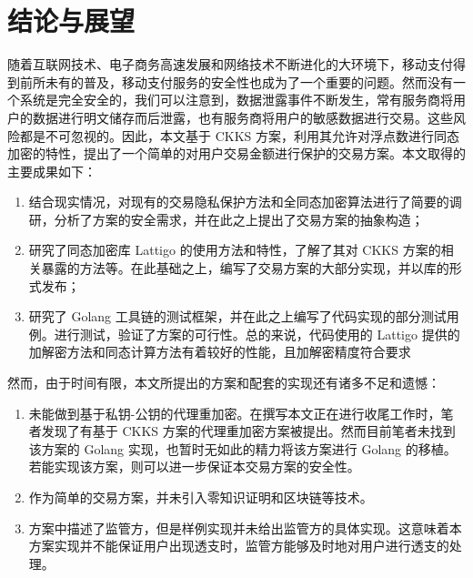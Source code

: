 \chapter{结论与展望}

随着互联网技术、电子商务高速发展和网络技术不断进化的大环境下，移动支付得到前所未有的普及，移动支付服务的安全性也成为了一个重要的问题。然而没有一个系统是完全安全的，我们可以注意到，数据泄露事件不断发生，常有服务商将用户的数据进行明文储存而后泄露，也有服务商将用户的敏感数据进行交易。这些风险都是不可忽视的。因此，本文基于 CKKS 方案，利用其允许对浮点数进行同态加密的特性，提出了一个简单的对用户交易金额进行保护的交易方案。本文取得的主要成果如下：

\begin{enumerate}
    \item 结合现实情况，对现有的交易隐私保护方法和全同态加密算法进行了简要的调研，分析了方案的安全需求，并在此之上提出了交易方案的抽象构造；
    \item 研究了同态加密库 Lattigo 的使用方法和特性，了解了其对 CKKS 方案的相关暴露的方法等。在此基础之上，编写了交易方案的大部分实现，并以库的形式发布；
    \item 研究了 Golang 工具链的测试框架，并在此之上编写了代码实现的部分测试用例。进行测试，验证了方案的可行性。总的来说，代码使用的 Lattigo 提供的加解密方法和同态计算方法有着较好的性能，且加解密精度符合要求
\end{enumerate}

然而，由于时间有限，本文所提出的方案和配套的实现还有诸多不足和遗憾：

\begin{enumerate}
    \item 未能做到基于私钥-公钥的代理重加密\cite{proxy_re_encryption}。在撰写本文正在进行收尾工作时，笔者发现了有基于 CKKS 方案的代理重加密方案被提出\cite{cryptoeprint:2017/410}。然而目前笔者未找到该方案的 Golang 实现，也暂时无如此的精力将该方案进行 Golang 的移植。若能实现该方案，则可以进一步保证本交易方案的安全性。
    \item 作为简单的交易方案，并未引入零知识证明和区块链等技术。
    \item 方案中描述了监管方，但是样例实现并未给出监管方的具体实现。这意味着本方案实现并不能保证用户出现透支时，监管方能够及时地对用户进行透支的处理。
\end{enumerate}
